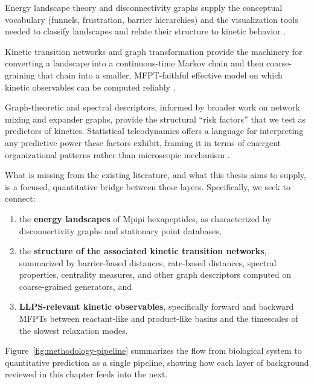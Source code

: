 Energy landscape theory and disconnectivity graphs supply the conceptual
vocabulary (funnels, frustration, barrier hierarchies) and the visualization
tools needed to classify landscapes and relate their structure to kinetic
behavior \cite{Onuchic1997NewView,Wales2003Book,Wales1998Archetypal}.

Kinetic transition networks and graph transformation provide the machinery for
converting a landscape into a continuous-time Markov chain and then
coarse-graining that chain into a smaller, MFPT-faithful effective model on
which kinetic observables can be computed reliably
\cite{Wales2002DPS,Stevenson2014GT,Wales2024FPT}.

Graph-theoretic and spectral descriptors, informed by broader work on network
mixing and expander graphs, provide the structural ``risk factors'' that we
test as predictors of kinetics. Statistical teleodynamics offers a language for
interpreting any predictive power these factors exhibit, framing it in terms of
emergent organizational patterns rather than microscopic mechanism
\cite{Murty2003RamanujanSurvey,Venkatasubramanian2017Teleodynamics}.

What is missing from the existing literature, and what this thesis aims to
supply, is a focused, quantitative bridge between these layers. Specifically,
we seek to connect:

\begin{enumerate}
  \item the \textbf{energy landscapes} of Mpipi hexapeptides, as characterized
        by disconnectivity graphs and stationary point databases,
  \item the \textbf{structure of the associated kinetic transition networks},
        summarized by barrier-based distances, rate-based distances, spectral
        properties, centrality measures, and other graph descriptors computed
        on coarse-grained generators, and
  \item \textbf{LLPS-relevant kinetic observables}, specifically forward and
        backward MFPTs between reactant-like and product-like basins and the
        timescales of the slowest relaxation modes.
\end{enumerate}

Figure~\ref{fig:methodology-pipeline} summarizes the flow from biological
system to quantitative prediction as a single pipeline, showing how each
layer of background reviewed in this chapter feeds into the next.

